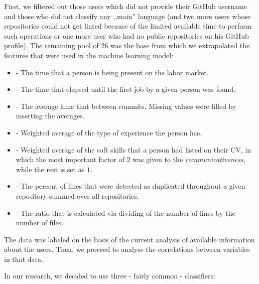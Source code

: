 First, we filtered out those users which did not provide their GitHub username and those who did not classify any ,,main'' language (and two more users whose repositories could not get linted because of the limited available time to perform such operations or one more user who had no public repositories on his GitHub profile). The remaining pool of 26 was the base from which we extrapolated the features that were used in the machine learning model:

\begin{itemize}
  \item {} - The time that a person is being present on the labor market.
  \item {} - The time that elapsed until the first job by a given person was found.
  \item {} - The average time that between commits. Missing values were filled by inserting the averages.
  \item {} - Weighted average of the type of experience the person has.
  \item {} - Weighted average of the soft skills that a person had listed on their CV, in which the most important factor of $2$ was given to the \emph{communicativeness}, while the rest is set as $1$. 
  \item {} - The percent of lines that were detected as duplicated throughout a given repository summed over all repositories.
  \item {} - The ratio that is calculated via dividing of the number of lines by the number of files.
\end{itemize}

The data was labeled on the basis of the current analysis of available information about the users. Then, we proceed to analyse the correlations between variables in that data.

In our research, we decided to use three - fairly common - classifiers:

